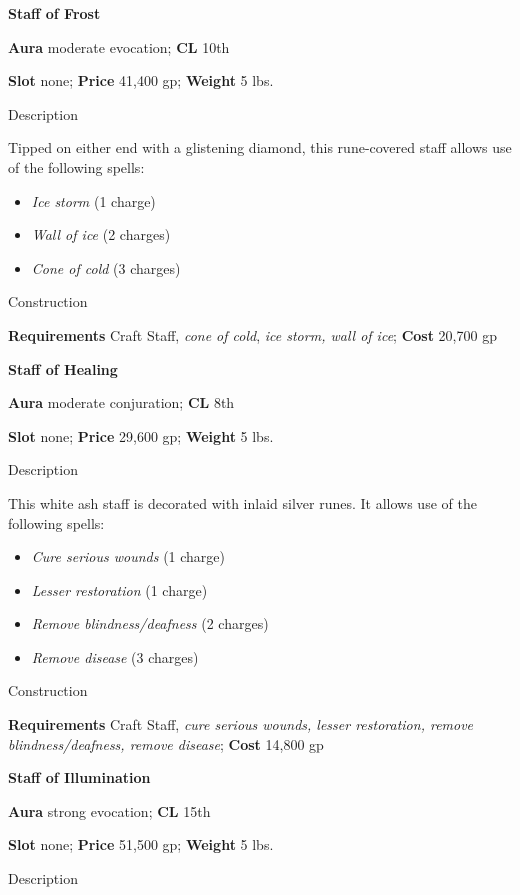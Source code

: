 \textbf{Staff of Frost}
				
\textbf{Aura} moderate evocation; \textbf{CL} 10th
				
\textbf{Slot }none; \textbf{Price} 41,400 gp; \textbf{Weight} 5 lbs.
				
Description
				
Tipped on either end with a glistening diamond, this rune-covered staff allows use of the following spells:
				\begin{itemize}\item  \textit{Ice storm }(1 charge)
				\item  \textit{Wall of ice }(2 charges)
				\item  \textit{Cone of cold }(3 charges)
\end{itemize}
				
Construction
				
\textbf{Requirements }Craft Staff, \textit{cone of cold}, \textit{ice storm, wall of ice}; \textbf{Cost} 20,700 gp
				
\textbf{Staff of Healing}
				
\textbf{Aura} moderate conjuration;\textbf{ CL }8th
				
\textbf{Slot} none; \textbf{Price} 29,600 gp; \textbf{Weight} 5 lbs.
				
Description
				
This white ash staff is decorated with inlaid silver runes. It allows use of the following spells:
				\begin{itemize}\item  \textit{Cure serious wounds} (1 charge)
				\item  \textit{Lesser restoration} (1 charge)
				\item  \textit{Remove blindness/deafness} (2 charges)
				\item  \textit{Remove disease} (3 charges) 
\end{itemize}
				
Construction
				
\textbf{Requirements} Craft Staff, \textit{cure serious wounds, lesser restoration, remove blindness/deafness, remove disease};\textbf{ Cost }14,800 gp
				
\textbf{Staff of Illumination}
				
\textbf{Aura} strong evocation;\textbf{ CL }15th
				
\textbf{Slot} none; \textbf{Price} 51,500 gp; \textbf{Weight} 5 lbs.
				
Description
				
